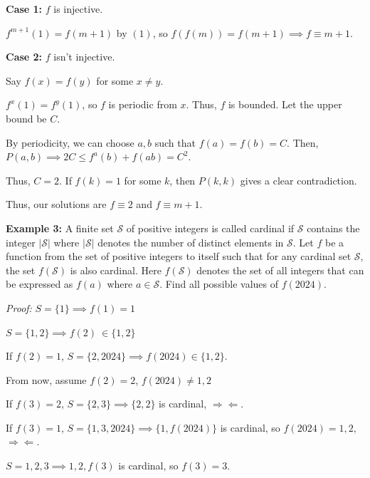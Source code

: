 \documentclass[10pt,letterpaper]{article}
\begin{document}
\textbf{Case 1:} $f$ is injective.

$f^{m+1}(1)=f(m+1)$ by $(1)$, so $f(f(m))=f(m+1)\implies f\equiv m+1$.

\textbf{Case 2:} $f$ isn't injective.

Say $f(x)=f(y)$ for some $x\neq y$.

$f^x(1)=f^y(1)$, so $f$ is periodic from $x$. Thus, $f$ is bounded. Let the upper bound be $C$.

By periodicity, we can choose $a,b$ such that $f(a)=f(b)=C$. Then, $P(a,b)\implies 2C\le f^a(b)+f(ab)=C^2$.

Thus, $C=2$. If $f(k)=1$ for some $k$, then $P(k,k)$ gives a clear contradiction.

Thus, our solutions are $\boxed{f\equiv 2}$ and $\boxed{f\equiv m+1}$.
\par{}
\par

\par\vspace{12pt}
\begin{tcolorbox}[breakable,title={INMO 2024 P4},colbacktitle=black!4,coltitle=black,fonttitle=\normalfont]
\textbf{Example 3:} A finite set $\mathcal{S}$ of positive integers is called cardinal if $\mathcal{S}$ contains the integer $|\mathcal{S}|$ where $|\mathcal{S}|$ denotes the number of distinct elements in $\mathcal{S}$. Let $f$ be a function from the set of positive integers to itself such that for any cardinal set $\mathcal{S}$, the set $f(\mathcal{S})$ is also cardinal. Here $f(\mathcal{S})$ denotes the set of all integers that can be expressed as $f(a)$ where $a \in \mathcal{S}$. Find all possible values of $f(2024)$.
\end{tcolorbox}
\textit{Proof:}
$S=\{1\}\implies f(1)=1$

$S=\{1,2\}\implies f(2)\ \in \{1,2\}$

If $f(2)=1$, $S=\{2,2024\}\implies f(2024)\in \{1,2\}$.

From now, assume $f(2)=2$, $f(2024)\neq 1,2$

If $f(3)=2$, $S=\{2,3\}\implies \{2,2\}$ is cardinal, $\Rightarrow\Leftarrow$.

If $f(3)=1$, $S=\{1,3,2024\}\implies \{1,f(2024)\}$ is cardinal, so $f(2024)=1,2$, $\Rightarrow \Leftarrow$.

$S={1,2,3}\implies {1,2,f(3)}$ is cardinal, so $f(3)=3$.
\end{document}
